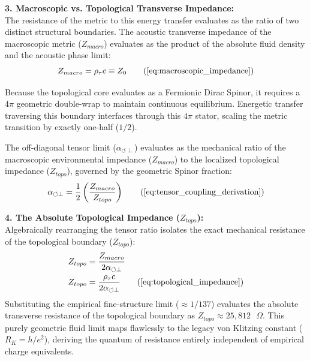 \documentclass[11pt, a4paper]{article}
\begin{document}
\textbf{3. Macroscopic vs. Topological Transverse Impedance:} \\
The resistance of the metric to this energy transfer evaluates as the ratio of two distinct structural boundaries. The acoustic transverse impedance of the macroscopic metric ($Z_{macro}$) evaluates as the product of the absolute fluid density and the acoustic phase limit:
\begin{equation}
    Z_{macro} = \rho_{\tau} c \equiv Z_0 \tag{\ref{eq:macroscopic_impedance}}
\end{equation}

Because the topological core evaluates as a Fermionic Dirac Spinor, it requires a $4\pi$ geometric double-wrap to maintain continuous equilibrium. Energetic transfer traversing this boundary interfaces through this $4\pi$ stator, scaling the metric transition by exactly one-half ($1/2$).

The off-diagonal tensor limit ($\alpha_{\circlearrowleft \perp}$) evaluates as the mechanical ratio of the macroscopic environmental impedance ($Z_{macro}$) to the localized topological impedance ($Z_{topo}$), governed by the geometric Spinor fraction:
\begin{equation}
    \alpha_{\circlearrowleft \perp} = \frac{1}{2} \left( \frac{Z_{macro}}{Z_{topo}} \right) \tag{\ref{eq:tensor_coupling_derivation}}
\end{equation}

\textbf{4. The Absolute Topological Impedance ($Z_{topo}$):} \\
Algebraically rearranging the tensor ratio isolates the exact mechanical resistance of the topological boundary ($Z_{topo}$):
\begin{align}
    Z_{topo} &= \frac{Z_{macro}}{2 \alpha_{\circlearrowleft \perp}} \nonumber \\
    Z_{topo} &= \frac{\rho_{\tau} c}{2 \alpha_{\circlearrowleft \perp}} \tag{\ref{eq:topological_impedance}}
\end{align}
Substituting the empirical fine-structure limit ($\approx 1/137$) evaluates the absolute transverse resistance of the topological boundary as $Z_{topo} \approx 25,812 \text{ }\Omega$. This purely geometric fluid limit maps flawlessly to the legacy von Klitzing constant ($R_K = h/e^2$), deriving the quantum of resistance entirely independent of empirical charge equivalents.
\end{document}
